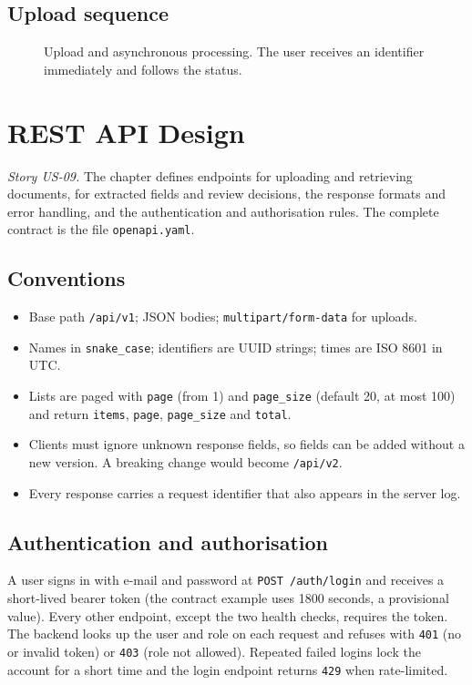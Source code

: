 \section{Upload sequence}
\begin{figure}[H]\centering
\resizebox{0.95\textwidth}{!}{}
\caption{Upload and asynchronous processing. The user receives an identifier immediately and follows the status.}\label{fig:p2sequpload}
\end{figure}

\chapter{REST API Design}\label{ch:p2api}
\emph{Story US-09.} The chapter defines endpoints for uploading and retrieving documents, for extracted fields and review decisions, the response formats and error handling, and the authentication and authorisation rules. The complete contract is the file \texttt{openapi.yaml}.

\section{Conventions}
\begin{itemize}
\item Base path \texttt{/api/v1}; JSON bodies; \texttt{multipart/form-data} for uploads.
\item Names in \texttt{snake\_case}; identifiers are UUID strings; times are ISO 8601 in UTC.
\item Lists are paged with \texttt{page} (from 1) and \texttt{page\_size} (default 20, at most 100) and return \texttt{items}, \texttt{page}, \texttt{page\_size} and \texttt{total}.
\item Clients must ignore unknown response fields, so fields can be added without a new version. A breaking change would become \texttt{/api/v2}.
\item Every response carries a request identifier that also appears in the server log.
\end{itemize}

\section{Authentication and authorisation}
A user signs in with e-mail and password at \texttt{POST /auth/login} and receives a short-lived bearer token (the contract example uses 1800 seconds, a provisional value). Every other endpoint, except the two health checks, requires the token. The backend looks up the user and role on each request and refuses with \texttt{401} (no or invalid token) or \texttt{403} (role not allowed). Repeated failed logins lock the account for a short time and the login endpoint returns \texttt{429} when rate-limited.

